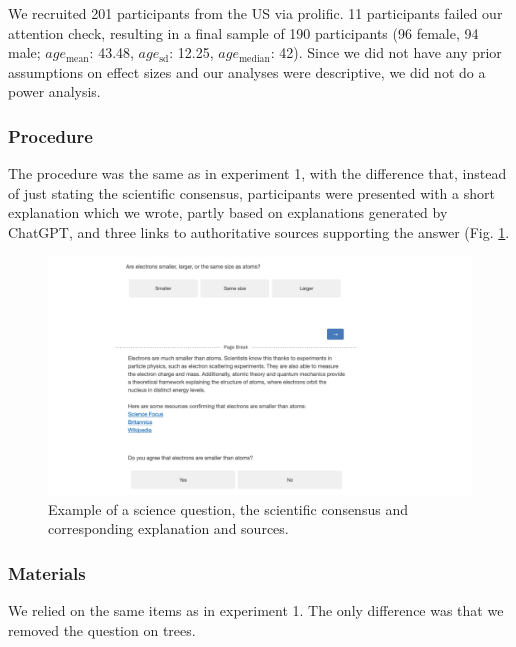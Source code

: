\documentclass[
  doc,floatsintext]{apa6}
\begin{document}
We recruited 201 participants from the US via prolific. 11 participants failed our attention check, resulting in a final sample of 190 participants (96 female, 94 male; \(age_\text{mean}\): 43.48, \(age_\text{sd}\): 12.25, \(age_\text{median}\): 42). Since we did not have any prior assumptions on effect sizes and our analyses were descriptive, we did not do a power analysis.

\subsubsection{Procedure}\label{procedure-1}

The procedure was the same as in experiment 1, with the difference that, instead of just stating the scientific consensus, participants were presented with a short explanation which we wrote, partly based on explanations generated by ChatGPT, and three links to authoritative sources supporting the answer (Fig. \ref{fig:exp2-stimulus-example}.



\begin{figure}

\includegraphics[width=1\linewidth]{./figures/study2_question_example} \hfill{}

\caption{Example of a science question, the scientific consensus and corresponding explanation and sources.}\label{fig:exp2-stimulus-example}
\end{figure}

\subsubsection{Materials}\label{materials-1}

We relied on the same items as in experiment 1. The only difference was that we removed the question on trees.
\end{document}
